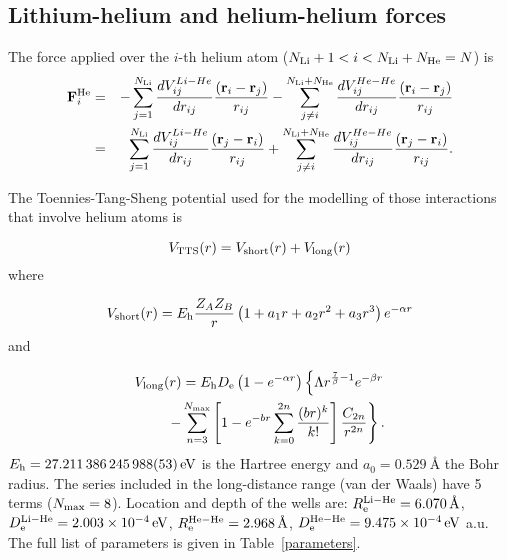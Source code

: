 \documentclass[jcp,amsmath,amssymb,preprint]{revtex4-1}
\begin{document}
\subsection{Lithium-helium and helium-helium forces}

The force applied over the $i$-th helium atom ($N_{\rm Li} + 1 < i < N_{\rm Li}+N_{\rm He} = N$) is 
\begin{eqnarray} \label{force_He}
            {\bf F}_i^{\rm He} &=& 
            - \sum_{j=1}^{N_{\rm Li}} \frac{dV^{Li-He}_{ij}}{dr_{ij}} \frac{({\bf r}_i-{\bf r}_j)}{r_{ij}} 
            - \sum_{j \neq i}^{N_{\rm Li}+N_{\rm He}} \frac{dV^{He-He}_{ij}}{dr_{ij}} \frac{({\bf r}_i-{\bf r}_j)}{r_{ij}}
             \\ \nonumber
            &=& \sum_{j=1}^{N_{\rm Li}} \frac{dV^{Li-He}_{ij}}{dr_{ij}} \frac{({\bf r}_j-{\bf r}_i)}{r_{ij}} 
            + \sum_{j \neq i}^{N_{\rm Li}+N_{\rm He}} \frac{dV^{He-He}_{ij}}{dr_{ij}} \frac{({\bf r}_j-{\bf r}_i)}{r_{ij}} .
\end{eqnarray}

The Toennies-Tang-Sheng potential used for the modelling of those interactions that involve helium atoms is

\begin{equation}
            V_{\rm TTS} (r) = V_{\rm short} (r) + V_{\rm long} (r)
\end{equation}
where

\begin{equation} \label{eq_TTSshort}
            V_{\rm short} (r) = E_{\rm h} \frac{Z_A Z_B}{r} \left( 1 + a_1 r + a_2 r^2 + a_3 r^3 \right) e^{-\alpha r}
\end{equation}
and

\begin{eqnarray} \label{eq_TTSlong}
            V_{\rm long} (r) = E_{\rm h} D_{\rm e} \left( 1 - e^{-\alpha r}\right) \left\{ \Lambda r^{\frac{7}{\beta}-1} e^{-\beta r} 
            \right. 
            \\ \nonumber
            \left.
            - \sum_{n=3}^{N_{\rm max}} \left[ 1 - e^{-b r} \sum_{k=0}^{2n} \frac{(br)^k}{k!}\right] \frac{C_{2n}}{r^{2n}} \right \}.
\end{eqnarray}
$E_{\rm h}=\SI{27.211386245988(53)}{eV}$ is the Hartree energy and $a_0=\SI{0.529}{\angstrom}$ the Bohr radius.
The series included in the long-distance range (van der Waals) have 5 terms ($N_{\rm max}=8$).
Location and depth of the wells are:
$R_{\rm e}^{\rm Li-He} = \SI{6.070}{\angstrom}$, 
$D_{\rm e}^{\rm Li-He} = \SI{2.003E-04}{eV}$, 
$R_{\rm e}^{\rm He-He} = \SI{2.968}{\angstrom}$, 
$D_{\rm e}^{\rm He-He} = \SI{9.475E-04}{eV}$ a.u.  
The full list of parameters is given in Table~\ref{parameters}.
\end{document}
